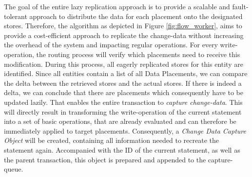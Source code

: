 The goal of the entire lazy replication approach is to provide a scalable and fault-tolerant approach to distribute the data for each placement onto the designated stores.
Therefore, the algorithm as depicted in Figure \ref{fig:flow_worker}, aims to provide a cost-efficient approach to replicate the change-data without increasing 
the overhead of the system and impacting regular operations. 
For every write-operation, the routing process will verify which placements need to receive this modification. During this process, all eagerly replicated stores for this entity
are identified. Since all entities contain a list of all Data Placements, we can compare the delta between the retrieved stores and the actual stores. 
If there is indeed a delta, we can conclude that there are placements which consequently have to be updated lazily. 
That enables the entire transaction to \emph{capture change-data}. This will directly result in transforming the write-operation of the current statement into a set of basic 
operations, that are already evaluated and can therefore be immediately applied to target placements. Consequently, a \emph{Change Data Capture Object} will be created, 
containing all information needed to recreate the statement again. Accompanied with the ID of the current statement, as well as the parent transaction, this object is prepared
and appended to the capture-queue.


